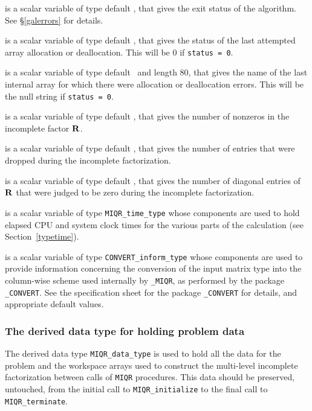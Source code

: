 \documentclass{galahad}
\newcommand{\packagename}{MIQR}
\newcommand{\fullpackagename}{\libraryname\_\packagename}
\begin{document}
\begin{description}

 is a scalar variable of type default \integer, that gives the
exit status of the algorithm. 
See \S\ref{galerrors} 
for details.

 is a scalar variable of type default \integer, that gives
the status of the last attempted array allocation or deallocation.
This will be 0 if {\tt status = 0}.

 is a scalar variable of type default \character\
and length 80, that  gives the name of the last internal array 
for which there were allocation or deallocation errors.
This will be the null string if {\tt status = 0}. 

 is a scalar variable of type default \integer, that 
gives the number of nonzeros in the incomplete factor ${\mathbf{R}}$.

 is a scalar variable of type default \integer, that 
gives the number of entries that were dropped during the incomplete 
factorization.

 is a scalar variable of type default \integer, that 
gives the number of diagonal entries of ${\mathbf{R}}$ that were judged to be zero
during the incomplete factorization.

 is a scalar variable of type {\tt \packagename\_time\_type} 
whose components are used to hold elapsed CPU and system clock times for 
the various parts of the calculation (see Section~\ref{typetime}).

 is a scalar variable of type 
{\tt CONVERT\_inform\_type}
whose components are used to provide information concerning
the conversion of the input matrix type into the column-wise scheme 
used internally by  {\tt \fullpackagename}, as performed by the package 
{\tt \libraryname\_CONVERT}. 
See the specification sheet for the package 
{\tt \libraryname\_CONVERT} 
for details, and appropriate default values.

\end{description}


\subsubsection{The derived data type for holding problem data}\label{typedata}
The derived data type
{\tt \packagename\_data\_type} 
is used to hold all the data for the problem and the workspace arrays 
used to construct the multi-level incomplete factorization between calls of 
{\tt \packagename} procedures. 
This data should be preserved, untouched, from the initial call to 
{\tt \packagename\_initialize}
to the final call to
{\tt \packagename\_terminate}.
\end{document}

